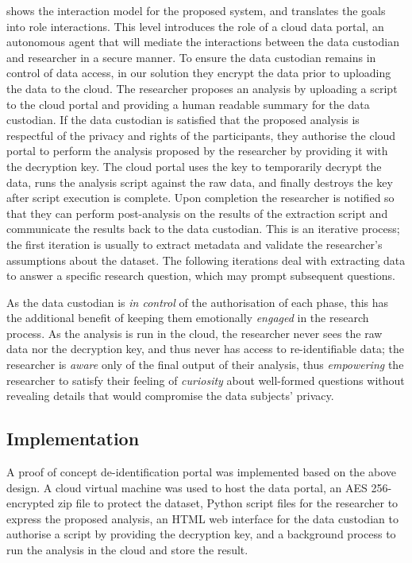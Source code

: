  shows the interaction model for the proposed system, and translates the goals into role interactions. This level introduces
the role of a cloud data portal, an autonomous agent that will mediate
the interactions between the data custodian and researcher in a secure
manner. To ensure the data custodian remains in control of data access,
in our solution they encrypt the data prior to uploading the data to the
cloud. The researcher proposes an analysis by uploading a script to the
cloud portal and providing a human readable summary for the data
custodian. If the data custodian is satisfied that the proposed analysis
is respectful of the privacy and rights of the participants, they
authorise the cloud portal to perform the analysis proposed by the
researcher by providing it with the decryption key. The cloud portal
uses the key to temporarily decrypt the data, runs the analysis script
against the raw data, and finally destroys the key after script
execution is complete. Upon completion the researcher is notified so
that they can perform post-analysis on the results of the extraction
script and communicate the results back to the data custodian. This is
an iterative process; the first iteration is usually to extract metadata
and validate the researcher's assumptions about the dataset. The
following iterations deal with extracting data to answer a specific
research question, which may prompt subsequent questions.

As the data custodian is \emph{in control} of the authorisation of each
phase, this has the additional benefit of keeping them emotionally
\emph{engaged} in the research process. As the analysis is run in the
cloud, the researcher never sees the raw data nor the decryption key,
and thus never has access to re-identifiable data; the researcher is
\emph{aware} only of the final output of their analysis, thus
\emph{empowering} the researcher to satisfy their feeling of
\emph{curiosity} about well-formed questions without revealing details
that would compromise the data subjects' privacy.

\subsection{Implementation}

A proof of concept de-identification portal was implemented based on the
above design. A cloud virtual machine was used to host the data portal,
an AES 256-encrypted zip file to protect the dataset, Python script
files for the researcher to express the proposed analysis, an HTML web
interface for the data custodian to authorise a script by providing the
decryption key, and a background process to run the analysis in the
cloud and store the result.

